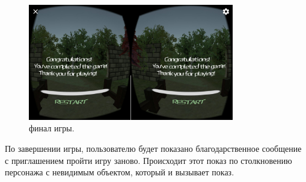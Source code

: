 \begin{figure}[h!]
    \centering
    \includegraphics[width=0.8\textwidth]{./screenshots/final.jpg}
    \caption{\small{финал игры.}}
    \label{final}
\end{figure} 

По завершении игры, пользователю будет показано благодарственное сообщение с приглашением пройти игру заново. Происходит этот показ по столкновению персонажа с невидимым объектом, который и вызывает показ.





